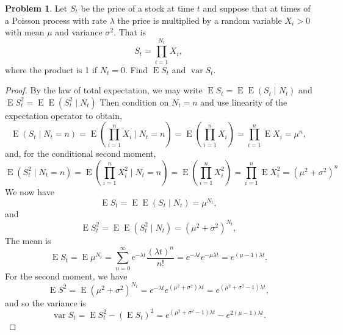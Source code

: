 \documentclass[oneside]{amsart}
\DeclareMathOperator{\E}{\mathrm{E}}
\DeclareMathOperator{\var}{\mathrm{var}}
\theoremstyle{definition}
\newtheorem{prob}{Problem}
\begin{document}
\begin{prob}
Let $S_t$ be the price of a stock at time $t$ and suppose that at times of a Poisson process with rate $\lambda$ the price is multiplied by a random variable $X_i >0$ with mean $\mu$ and variance $\sigma^2$. That is 
\[
	S_t = \prod_{i=1}^{N_t} X_i,
\]
where the product is 1 if $N_t = 0$. Find $\E S_t$ and $\var S_t$.
\end{prob}

\begin{proof}
By the law of total expectation, we may write $\E S_t = \E\E(S_t \mid N_t)$ and $\E S_t^2 = \E\E(S_t^2 \mid N_t)$ Then condition on $N_t = n$ and use linearity of the expectation operator to obtain,
\[
	\E (S_t \mid N_t = n) = \E \left( \prod_{i=1}^n X_i \mid N_t = n \right)
	= \E \left( \prod_{i=1}^n X_i \right)
	=  \prod_{i=1}^n \E X_i 
	= \mu^n,
\]
and, for the conditional second moment, 
\[
	\E(S_t^2 \mid N_t = n) = \E \left( \prod_{i=1}^n X_i^2 \mid N_t = n \right)
	= \E \left( \prod_{i=1}^n X_i^2 \right)
	=  \prod_{i=1}^n \E X_i^2  
	= (\mu^2 + \sigma^2 )^n
\]
We now have 
\[
	\E S_t = \E \E (S_t \mid N_t) = \mu^{N_t}, 
\]
and 
\[
	\E S_t^2 = \E \E (S_t^2 \mid N_t) = (\mu^2 + \sigma^2)^{N_t}, 
\]
The mean is 
\[
	\E S_t = \E \mu^{N_t} 
	= \sum_{n=0}^\infty e^{-\lambda t} \frac{(\lambda t)^n}{n!} 
	=e^{-\lambda t}e^{-\mu \lambda t}
	= e^{(\mu - 1)\lambda t}.
\]
For the second moment, we have 
\[
	\E S^2 = \E  (\mu^2 + \sigma^2)^{N_t} 
	= e^{-\lambda t} e^{(\mu^2+ \sigma^2)\lambda t} 
	= e^{(\mu^2 + \sigma^2 -1)\lambda t},
\]
and so the variance is
\[
	\var S_t = \E S_t^2 - (\E S_t)^2 = e^{(\mu^2 + \sigma^2 -1)\lambda t} - e^{2(\mu - 1)\lambda t}.
\]
\end{proof}
\end{document}

